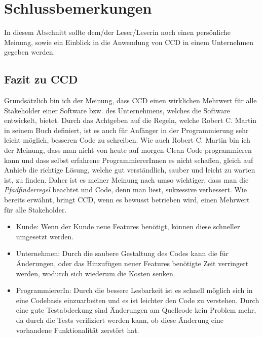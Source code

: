 \chapter{Schlussbemerkungen}
\label{cha:Schluss}
In diesem Abschnitt sollte dem/der Leser/Leserin noch einen persönliche Meinung, sowie ein Einblick in die Anwendung von CCD in einem Unternehmen gegeben werden.
\section{Fazit zu CCD}
 Grundsätzlich bin ich der Meinung, dass CCD einen wirklichen Mehrwert für alle Stakeholder einer Software bzw. des Unternehmens, welches die Software entwickelt, bietet. Durch das Achtgeben auf die Regeln, welche Robert C. Martin in seinem Buch definiert, ist es auch für Anfänger in der Programmierung sehr leicht möglich, besseren Code zu schreiben. Wie auch Robert C. Martin bin ich der Meinung, dass man nicht von heute auf morgen Clean Code programmieren kann und dass selbst erfahrene ProgrammiererInnen es nicht schaffen, gleich auf Anhieb die richtige Lösung, welche gut verständlich, sauber und leicht zu warten ist, zu finden. Daher ist es meiner Meinung nach umso wichtiger, dass man die \textit{Pfadfinderregel} beachtet und Code, denn man liest, sukzessive verbessert. Wie bereits erwähnt, bringt CCD, wenn es bewusst betrieben wird, einen Mehrwert für alle Stakeholder. 
\begin{itemize}
	\item Kunde: Wenn der Kunde neue Features benötigt, können diese schneller umgesetzt werden.
	\item Unternehmen: Durch die saubere Gestaltung des Codes kann die für Änderungen, oder das Hinzufügen neuer Features benötigte Zeit verringert werden, wodurch sich wiederum die Kosten senken.
	\item ProgrammiererIn: Durch die bessere Lesbarkeit ist es schnell möglich sich in eine Codebasis einzuarbeiten und es ist leichter den Code zu verstehen. Durch eine gute Testabdeckung sind Änderungen am Quellcode kein Problem mehr, da durch die Tests verifiziert werden kann, ob diese Änderung eine vorhandene Funktionalität zerstört hat.
\end{itemize}



